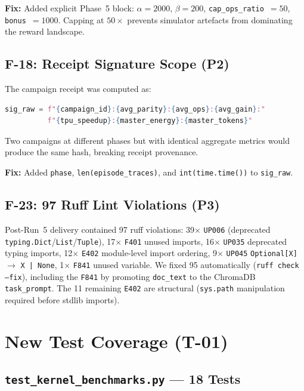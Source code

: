 \documentclass[10pt,twocolumn]{article}
\begin{document}
\textbf{Fix:} Added explicit Phase~5 block:
$\alpha=2000$, $\beta=200$, \texttt{cap\_ops\_ratio}~$=50$,
\texttt{bonus}~$=1000$.  Capping at $50\times$ prevents simulator
artefacts from dominating the reward landscape.

\subsection{F-18: Receipt Signature Scope (P2)}

The campaign receipt was computed as:
\begin{lstlisting}[language=Python]
sig_raw = f"{campaign_id}:{avg_parity}:{avg_ops}:{avg_gain}:"
          f"{tpu_speedup}:{master_energy}:{master_tokens}"
\end{lstlisting}
Two campaigns at different phases but with identical aggregate metrics would
produce the same hash, breaking receipt provenance.

\textbf{Fix:} Added \texttt{phase}, \texttt{len(episode\_traces)}, and
\texttt{int(time.time())} to \texttt{sig\_raw}.

\subsection{F-23: 97 Ruff Lint Violations (P3)}

Post-Run~5 delivery contained 97 ruff violations:
39$\times$ \texttt{UP006} (deprecated \texttt{typing.Dict}/\texttt{List}/\texttt{Tuple}),
17$\times$ \texttt{F401} unused imports,
16$\times$ \texttt{UP035} deprecated typing imports,
12$\times$ \texttt{E402} module-level import ordering,
9$\times$ \texttt{UP045} \texttt{Optional[X]} $\to$ \texttt{X | None},
1$\times$ \texttt{F841} unused variable.
We fixed 95 automatically (\texttt{ruff check --fix}), including the
\texttt{F841} by promoting \texttt{doc\_text} to the ChromaDB
\texttt{task\_prompt}.  The 11 remaining \texttt{E402} are structural
(\texttt{sys.path} manipulation required before stdlib imports).

\section{New Test Coverage (T-01)}

\subsection{\texttt{test\_kernel\_benchmarks.py} — 18 Tests}
\end{document}
